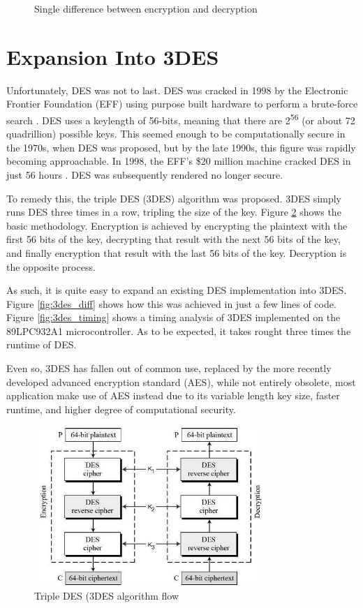 \documentclass[conference]{IEEEtran}
\begin{document}
\begin{figure}[ht]
  \centering
  
  \caption{Single difference between encryption and decryption}
  \label{fig:diff}
\end{figure}

\section{Expansion Into 3DES}
Unfortunately, DES was not to last. DES was cracked in 1998 by the Electronic Frontier Foundation (EFF) using purpose built hardware to perform a brute-force search \cite{des_cracker}. DES uses a keylength of 56-bits, meaning that there are 2\textsuperscript{56} (or about 72 quadrillion) possible keys. This seemed enough to be computationally secure in the 1970s, when DES was proposed, but by the late 1990s, this figure was rapidly becoming approachable. In 1998, the EFF's \$20 million machine cracked DES in just 56 hours \cite{des_cracker}. DES was subsequently rendered no longer secure.

To remedy this, the triple DES (3DES) algorithm was proposed. 3DES simply runs DES three times in a row, tripling the size of the key. Figure \ref{fig:3des_flowchart} shows the basic methodology. Encryption is achieved by encrypting the plaintext with the first 56 bits of the key, decrypting that result with the next 56 bits of the key, and finally encryption that result with the last 56 bits of the key. Decryption is the opposite process.

As such, it is quite easy to expand an existing DES implementation into 3DES. Figure \ref{fig:3des_diff} shows how this was achieved in just a few lines of code. Figure \ref{fig:3des_timing} shows a timing analysis of 3DES implemented on the 89LPC932A1 microcontroller. As to be expected, it takes rought three times the runtime of DES.

Even so, 3DES has fallen out of common use, replaced by the more recently developed advanced encryption standard (AES), while not entirely obsolete, most application make use of AES instead due to its variable length key size, faster runtime, and higher degree of computational security.

\begin{figure}[ht]
	\centering
  \includegraphics[width=3.4in]{3des.png}
  \caption{Triple DES (3DES algorithm flow}
  \label{fig:3des_flowchart}
\end{figure}
\end{document}
